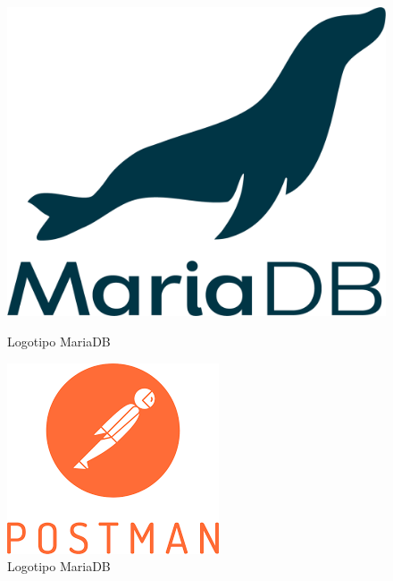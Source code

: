 \documentclass[11pt,spanish,listoffigures,listoftables]{tfgetsinf}
\begin{document}
\begin{figure}[!htb]
    \includegraphics[width=\linewidth]{img/mariadb_logo.png}
    \caption{Logotipo MariaDB}\label{fig:LogoMariaDB}
  \endminipage\hfill
   \includegraphics[width=\linewidth]{img/postman_logo.png}
   \caption{Logotipo MariaDB}\label{fig:LogoPostman}
 \endminipage\hfill

\end{figure}
\end{document}
